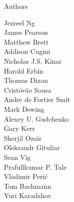 \begin{frame}{Authors}
\begin{multicols}{5}
Jezreel Ng\\
James Pearson\\
Matthew Brett\\
Addison Cugini\\
Nicholas J.S. Kinar\\
Harold Erbin\\
Thomas Dixon\\
Cristóvão Sousa\\
Andre de Fortier Smit\\
Mark Dewing\\
Alexey U. Gudchenko\\
Gary Kerr\\
Sherjil Ozair\\
Oleksandr Gituliar\\
Sean Vig\\
Prafullkumar P. Tale\\
Vladimir Perić\\
Tom Bachmann\\
Yuri Karadzhov\\
\end{multicols}
\end{frame}
